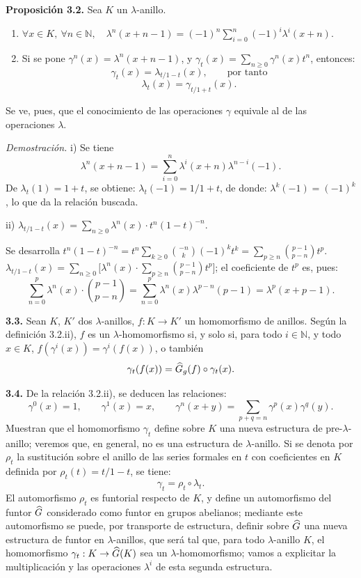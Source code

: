 \textbf{Proposición 3.2.} Sea \(K\) un \(\lambda\)-anillo.
\begin{enumerate}[label=\roman*)]
\item \(\forall x\in K,\ \forall n\in\mathbb N,\quad \lambda^n(x+n-1)=(-1)^n\sum_{i=0}^n(-1)^i\lambda^i(x+n).\)
\item Si se pone \(\gamma^n(x)=\lambda^n(x+n-1)\), y \(\gamma_t(x)=\sum_{n\ge0}\gamma^n(x)t^n\), entonces:
\[
  \gamma_t(x)=\lambda_{t/1-t}(x),\qquad\text{por tanto}
\]
\[
  \lambda_t(x)=\gamma_{t/1+t}(x).
\]
\end{enumerate}
Se ve, pues, que el conocimiento de las operaciones \(\gamma\) equivale al de las operaciones \(\lambda\).

\emph{Demostración.} i) Se tiene
\[
  \lambda^n(x+n-1)=\sum_{i=0}^{n}\lambda^i(x+n)\lambda^{n-i}(-1).
\]
De \(\lambda_t(1)=1+t\), se obtiene: \(\lambda_t(-1)=1/1+t\), de donde: \(\lambda^k(-1)=(-1)^k\), lo que da la relación buscada.

ii) \(\lambda_{t/1-t}(x)=\sum_{n\ge0}\lambda^n(x)\cdot t^n(1-t)^{-n}.\)

Se desarrolla \(t^n(1-t)^{-n}=t^n\sum_{k\ge0}\binom{-n}{k}(-1)^kt^k=\sum_{p\ge n}\binom{p-1}{p-n}t^p\). \(\lambda_{t/1-t}(x)=\sum_{n\ge0}\bigl[\lambda^n(x)\cdot\sum_{p\ge n}\binom{p-1}{p-n}t^p\bigr]\); el coeficiente de \(t^p\) es, pues:
\[
  \sum_{n=0}^{p}\lambda^n(x)\cdot\binom{p-1}{p-n}
  =\sum_{n=0}^{p}\lambda^n(x)\lambda^{p-n}(p-1)
  =\lambda^p(x+p-1).
\]

\textbf{3.3.} Sean \(K\), \(K'\) dos \(\lambda\)-anillos, \(f:K\to K'\) un homomorfismo de anillos. Según la definición 3.2.ii), \(f\) es un \(\lambda\)-homomorfismo si, y solo si, para todo \(i\in\mathbb N\), y todo \(x\in K\), \(f(\gamma^i(x))=\gamma^i(f(x))\), o también
\[
  \gamma_t(f(x))=\widehat G_g(f)\circ\gamma_t(x).
\]

\textbf{3.4.} De la relación 3.2.ii), se deducen las relaciones:
\begin{equation}\tag{3.4.1}
  \gamma^0(x)=1,
  \qquad \gamma^1(x)=x,
  \qquad \gamma^n(x+y)=\sum_{p+q=n}\gamma^p(x)\gamma^q(y).
\end{equation}
Muestran que el homomorfismo \(\gamma_t\) define sobre \(K\) una nueva estructura de pre-\(\lambda\)-anillo; veremos que, en general, no es una estructura de \(\lambda\)-anillo. Si se denota por \(\rho_t\) la sustitución sobre el anillo de las series formales en \(t\) con coeficientes en \(K\) definida por \(\rho_t(t)=t/1-t\), se tiene:
\[
  \gamma_t=\rho_t\circ\lambda_t.
\]
El automorfismo \(\rho_t\) es funtorial respecto de \(K\), y define un automorfismo del funtor \(\widehat G\) considerado como funtor en grupos abelianos; mediante este automorfismo se puede, por transporte de estructura, definir sobre \(\widehat G\) una nueva estructura de funtor en \(\lambda\)-anillos, que será tal que, para todo \(\lambda\)-anillo \(K\), el homomorfismo \(\gamma_t:K\to\widehat G(K)\) sea un \(\lambda\)-homomorfismo; vamos a explicitar la multiplicación y las operaciones \(\lambda^i\) de esta segunda estructura.

